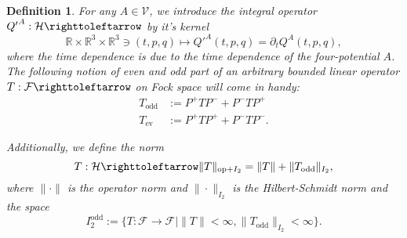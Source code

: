 \documentclass[b5paper,draft,openbib,12pt]{memoir}
\newtheorem{Def}{Definition}
\DeclareMathOperator{\odd}{odd}
\begin{document}
\begin{Def}
For any \(A\in\mathcal{V}\), we introduce the 
integral operator 
\({Q'}^A:\mathcal{H}\righttoleftarrow\) by it's kernel
\begin{equation}
\mathbb{R}\times\mathbb{R}^3\times\mathbb{R}^3
\ni(t,p,q)\mapsto {Q'}^A(t,p,q)=\partial_t Q^A(t,p,q),
\end{equation}
where the time dependence is due to the time dependence of the 
four-potential \(A\).
The following notion of even and odd part of 
an arbitrary bounded linear operator 
\(T:\mathcal{F}\righttoleftarrow\) on 
Fock space will come in handy:
\begin{align}
T_{\mathrm{odd}}&:=P^+TP^- + P^-TP^+\\
T_{\mathrm{ev}}&:=P^+TP^+ + P^-TP^-.
\end{align}

Additionally, we define the norm 
\begin{equation}
  T:\mathcal{H}\righttoleftarrow \|T\|_{\mathrm{op}+I_2}=\|T\|+\|T_{\odd}\|_{I_2},
\end{equation}
where \(\|\cdot\|\) is the operator norm and \(\|\cdot\|_{I_2}\) is the 
Hilbert-Schmidt norm and the space
\begin{equation}
I_2^{\odd}:=\{T:\mathcal{F}\rightarrow \mathcal{F}\mid
\|T\|<\infty, \|T_{\odd}\|_{I_2}<\infty\}.
\end{equation}

\end{Def}
\end{document}
